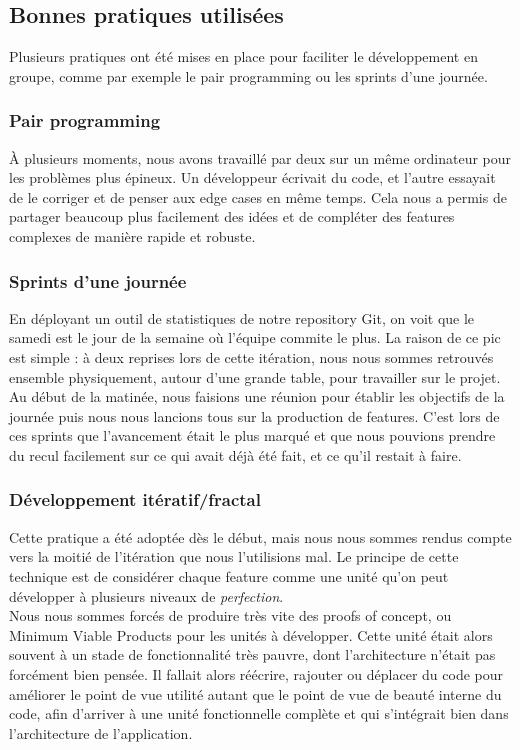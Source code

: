 \subsection{Bonnes pratiques utilisées}
Plusieurs pratiques ont été mises en place pour faciliter le développement en 
groupe, comme par exemple le pair programming ou les sprints d'une journée.

	\subsubsection{Pair programming}
	\`A plusieurs moments, nous avons travaillé par deux sur un même ordinateur pour
	les problèmes plus épineux. Un développeur écrivait du code, et l'autre essayait
	de le corriger et de penser aux edge cases en même temps. Cela nous a permis de 
	partager beaucoup plus facilement des idées et de compléter des features
	complexes de manière rapide et robuste.

	\subsubsection{Sprints d'une journée}
	En déployant un outil de statistiques de notre repository Git, on voit que le 
	samedi est le jour de la semaine où l'équipe commite le plus. La raison de ce 
	pic est simple : à deux reprises lors de cette itération, nous nous sommes
	retrouvés ensemble physiquement, autour d'une grande table, pour travailler sur
	le projet. \\

	Au début de la matinée, nous faisions une réunion pour établir les
	objectifs de la journée puis nous nous lancions tous sur la production de
	features. C'est lors de ces sprints que l'avancement était le plus marqué et 
	que nous pouvions prendre du recul facilement sur ce qui avait déjà été fait, 
	et ce qu'il restait à faire.

	\subsubsection{Développement itératif/fractal}
	Cette pratique a été adoptée dès le début, mais nous nous sommes rendus compte
	vers la moitié de l'itération que nous l'utilisions mal. Le principe de cette
	technique est de considérer chaque feature comme une unité qu'on peut développer
	à plusieurs niveaux de \textit{perfection}. \\

	Nous nous sommes forcés de produire très vite des proofs of concept, ou 
	Minimum Viable Products pour les unités à développer. Cette unité était 
	alors souvent à un stade de fonctionnalité très pauvre, dont l'architecture 
	n'était pas forcément bien pensée. Il fallait alors réécrire, rajouter ou 
	déplacer du code pour améliorer le point de vue utilité autant que le point 
	de vue de beauté interne du code, afin d'arriver à une unité fonctionnelle 
	complète et qui s'intégrait bien dans l'architecture de l'application. \\


